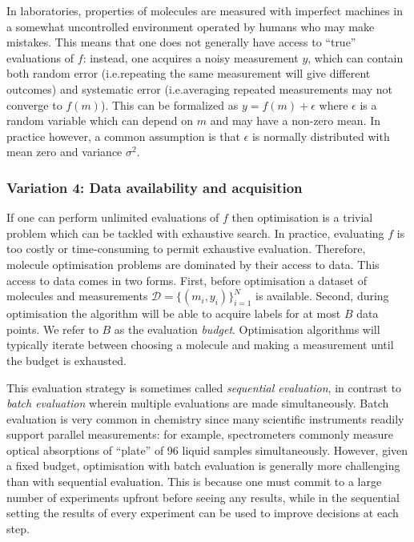 In laboratories, properties of molecules are measured with imperfect machines
in a somewhat uncontrolled environment
operated by humans who may make mistakes.
This means that one does not generally have access to ``true'' evaluations of $f$:
instead, one acquires a noisy measurement $y$,
which can contain both random error (i.e.\@ repeating the same measurement will give different outcomes)
and systematic error (i.e.\@ averaging repeated measurements may not converge to $f(m)$).
This can be formalized as $y=f(m)+\epsilon$
where $\epsilon$ is a random variable which can depend on $m$ and may have a non-zero mean.
In practice however, a common assumption is that $\epsilon$ is normally distributed with
mean zero and variance $\sigma^2$.

\subsubsection{Variation 4: Data availability and acquisition}

If one can perform unlimited evaluations of $f$ then optimisation is a trivial problem
which can be tackled with exhaustive search.
In practice, evaluating $f$ is too costly or time-consuming to permit exhaustive evaluation.
Therefore, molecule optimisation problems are dominated by their access to data.
This access to data comes in two forms.
First, before optimisation a dataset of molecules and measurements
$\mathcal{D}=\{(m_i,y_i)\}_{i=1}^N$
is available.
Second, during optimisation the algorithm will be able to acquire labels for at most $B$
data points.
We refer to $B$ as the evaluation \emph{budget}.
Optimisation algorithms will typically iterate between choosing a molecule
and making a measurement until the budget is exhausted.

This evaluation strategy is sometimes called \emph{sequential evaluation},
in contrast to \emph{batch evaluation} wherein multiple evaluations are made simultaneously.
Batch evaluation is very common in chemistry since many scientific instruments
readily 
support parallel measurements:
for example, spectrometers commonly measure optical absorptions of ``plate''
of 96 liquid samples simultaneously.
However, given a fixed budget, optimisation with batch evaluation is generally more
challenging than with sequential evaluation.
This is because one must commit to a large number of experiments upfront
before seeing any results,
while in the sequential setting the results of every experiment can be used to improve
decisions at each step.

